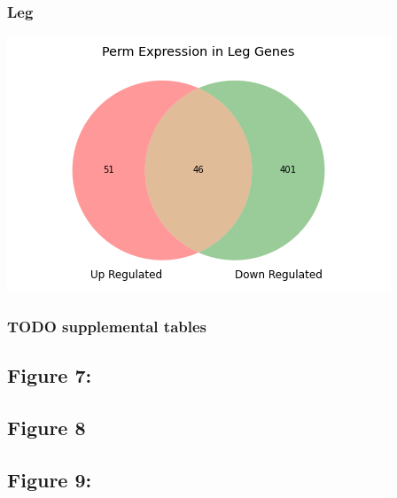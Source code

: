 \documentclass[11pt]{article}
\begin{document}
\subsubsection{Leg}
\label{sec:orgf9dbc02}
\begin{center}
\includegraphics[width=.9\linewidth]{figure6/PermLegDeseq.png}
\end{center}
\subsubsection{{\bfseries\sffamily TODO} supplemental tables}
\label{sec:orgdd49d6b}
\subsection{Figure 7:}
\label{sec:org655fa3a}
\subsection{Figure 8}
\label{sec:org9a76e36}
\subsection{Figure 9:}
\label{sec:org87ea6df}
\end{document}

